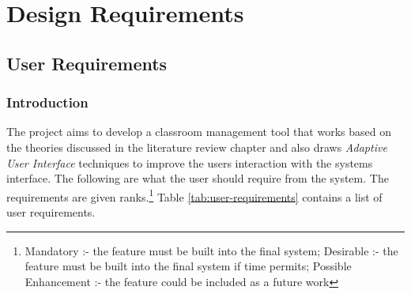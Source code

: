 \section{Design Requirements} \label{sec:designRequirements}
\subsection{User Requirements} \label{sub:userRequirments}
\subsubsection{Introduction}
The project aims to develop a classroom management tool that works based on the theories discussed in the literature review chapter and also draws \emph{Adaptive User Interface} techniques to improve the users interaction with the systems interface. The following are what the user should require from the system. The requirements are given ranks.\footnote{ Mandatory :- the feature must be built into the final system; Desirable :- the feature must be built into the final system if time permits; Possible Enhancement :- the feature could be included as a future work} Table \ref{tab:user-requirements} contains a list of user requirements.
